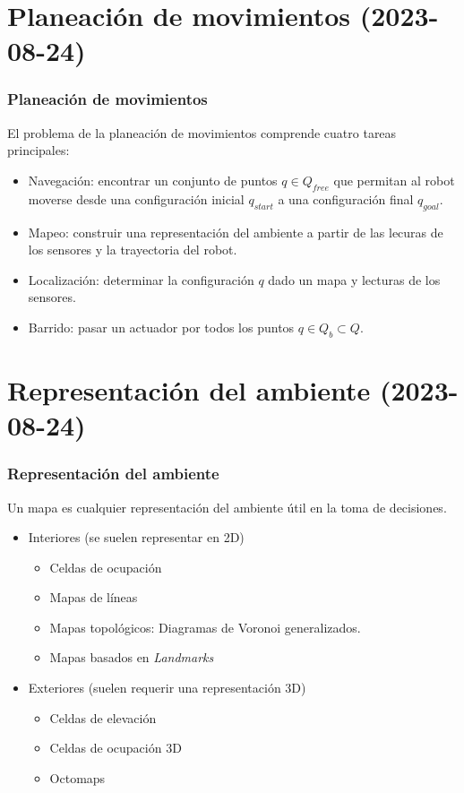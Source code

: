 \section{Planeación de movimientos (2023-08-24)}

\begin{frame}\frametitle{Planeación de movimientos}
  El problema de la planeación de movimientos comprende cuatro tareas principales:
  \begin{itemize}
  \item Navegación: encontrar un conjunto de puntos $q \in Q_{free}$ que permitan al robot moverse desde una configuración inicial $q_{start}$ a una configuración final $q_{goal}$. 
  \item Mapeo: construir una representación del ambiente a partir de las lecuras de los sensores y la trayectoria del robot. 
  \item Localización: determinar la configuración $q$ dado un mapa y lecturas de los sensores. 
  \item Barrido: pasar un actuador por todos los puntos $q\in Q_b \subset Q$.
  \end{itemize}
\end{frame}

\section{Representación del ambiente (2023-08-24)}
\begin{frame}\frametitle{Representación del ambiente}
  Un mapa es cualquier representación del ambiente útil en la toma de decisiones.
  \begin{itemize}
  \item Interiores (se suelen representar en 2D)
    \begin{itemize}
    \item Celdas de ocupación
    \item Mapas de líneas
    \item Mapas topológicos: Diagramas de Voronoi generalizados. 
    \item Mapas basados en \textit{Landmarks}
    \end{itemize}
  \item Exteriores (suelen requerir una representación 3D)
    \begin{itemize}
    \item Celdas de elevación
    \item Celdas de ocupación 3D
    \item Octomaps
    \end{itemize}
  \end{itemize}
\end{frame}

